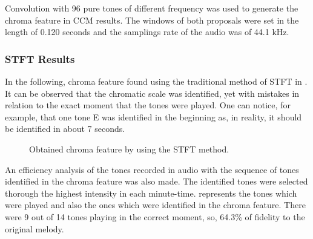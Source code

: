 \documentclass{article}
\begin{document}
	Convolution with 96 pure tones of different frequency was used to generate the chroma feature in CCM results. The windows of both proposals were set in the length of 0.120 seconds and the samplings rate of the audio was of 44.1 kHz.

	\subsubsection{STFT Results}
	In the following, chroma feature found using the traditional method of STFT in . It can be observed that the chromatic scale was identified, yet with mistakes in relation to the exact moment that the tones were played.  One can notice, for example, that one tone E was identified in the beginning as, in reality, it should be identified in about 7 seconds. 

	
	\begin{figure}[h!]
	 \centerline{}
	 \caption{Obtained chroma feature by using the STFT method.}
	 \label{fig:1-ssft}
	\end{figure}	

	
	An efficiency analysis of the tones recorded in audio with the sequence of tones identified in the chroma feature was also made. The identified tones were selected thorough the highest intensity in each minute-time.  represents the tones which were played and also the ones which were identified in the chroma feature. There were 9 out of 14 tones playing in the correct moment, so, 64.3\% of fidelity to the original melody.  

	
\end{document}
